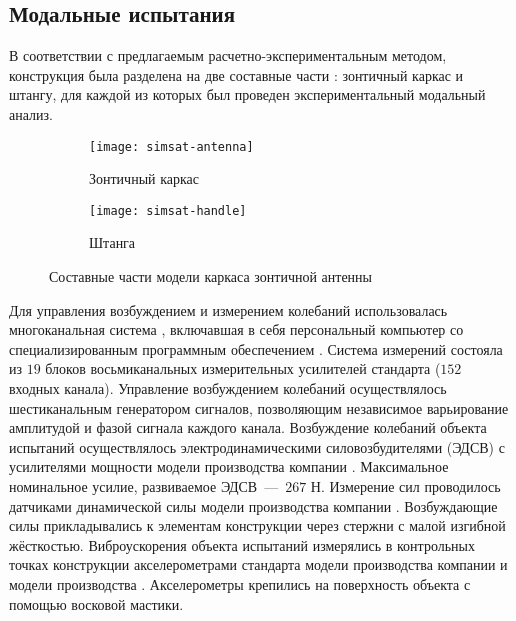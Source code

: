 \subsection{Модальные испытания}

В соответствии с предлагаемым расчетно-экспериментальным методом, конструкция была разделена на две составные части : зонтичный каркас и штангу, для каждой из которых был проведен экспериментальный модальный анализ.

\begin{figure}[!htb]
	\centering
	\begin{subfigure}[t]{0.48\textwidth}
		\centering
		\texttt{[image: simsat-antenna]}
		\caption{Зонтичный каркас}
	\end{subfigure}
	\hfill
	\begin{subfigure}[t]{0.48\textwidth}
		\centering
		\texttt{[image: simsat-handle]}
		\caption{Штанга}
	\end{subfigure}	
	\caption{Составные части модели каркаса зонтичной антенны} \label{fig:simsat-parts}
\end{figure}

Для управления возбуждением и измерением колебаний использовалась многоканальная система  , включавшая в себя персональный компьютер со специализированным программным обеспечением . Система измерений состояла из $ 19 $ блоков восьмиканальных измерительных усилителей стандарта  ($ 152 $ входных канала). Управление возбуждением колебаний осуществлялось шестиканальным генератором сигналов, позволяющим независимое варьирование амплитудой и фазой сигнала каждого канала. Возбуждение колебаний объекта испытаний осуществлялось электродинамическими силовозбудителями (ЭДСВ)  с усилителями мощности модели   производства компании  . Максимальное номинальное усилие, развиваемое ЭДСВ~---~$ 267 $ Н. Измерение сил проводилось датчиками динамической силы модели  производства компании . Возбуждающие силы прикладывались к элементам конструкции через стержни с малой изгибной жёсткостью. Виброускорения объекта испытаний измерялись в контрольных точках конструкции акселерометрами стандарта  модели  производства компании  и модели  производства  . Акселерометры крепились на поверхность объекта с помощью восковой мастики.

